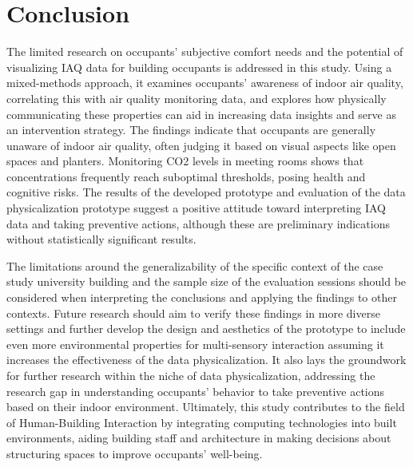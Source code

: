 \section{Conclusion}
\label{sec:conclusion}

The limited research on occupants' subjective comfort needs and the potential of visualizing IAQ data for building occupants is addressed in this study. Using a mixed-methods approach, it examines occupants' awareness of indoor air quality, correlating this with air quality monitoring data, and explores how physically communicating these properties can aid in increasing data insights and serve as an intervention strategy. The findings indicate that occupants are generally unaware of indoor air quality, often judging it based on visual aspects like open spaces and planters. Monitoring CO2 levels in meeting rooms shows that concentrations frequently reach suboptimal thresholds, posing health and cognitive risks.  The results of the developed prototype and evaluation of the data physicalization prototype suggest a positive attitude toward interpreting IAQ data and taking preventive actions, although these are preliminary indications without statistically significant results. 

The limitations around the generalizability of the specific context of the case study university building and the sample size of the evaluation sessions should be considered when interpreting the conclusions and applying the findings to other contexts. Future research should aim to verify these findings in more diverse settings and further develop the design and aesthetics of the prototype to include even more environmental properties for multi-sensory interaction assuming it increases the effectiveness of the data physicalization. It also lays the groundwork for further research within the niche of data physicalization, addressing the research gap in understanding occupants' behavior to take preventive actions based on their indoor environment. Ultimately, this study contributes to the field of Human-Building Interaction by integrating computing technologies into built environments, aiding building staff and architecture in making decisions about structuring spaces to improve occupants' well-being.
